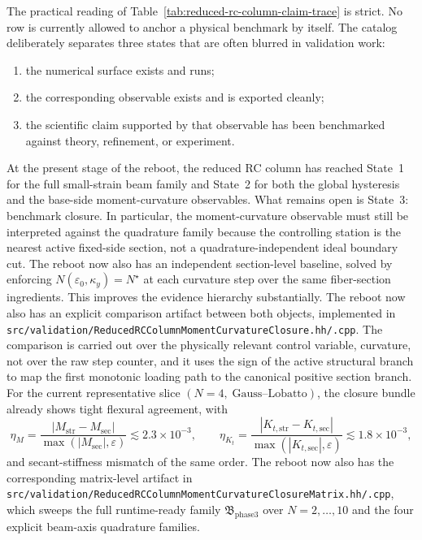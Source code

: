 The practical reading of Table~\ref{tab:reduced-rc-column-claim-trace} is
strict.  No row is currently allowed to anchor a physical benchmark by itself.
The catalog deliberately separates three states that are often blurred in
validation work:
\begin{enumerate}
  \item the numerical surface exists and runs;
  \item the corresponding observable exists and is exported cleanly;
  \item the scientific claim supported by that observable has been benchmarked
    against theory, refinement, or experiment.
\end{enumerate}
At the present stage of the reboot, the reduced RC column has reached
State~1 for the full small-strain beam family and State~2 for both the global
hysteresis and the base-side moment-curvature observables.  What remains open
is State~3: benchmark closure.  In particular, the moment-curvature observable
must still be interpreted against the quadrature family because the controlling
station is the nearest active fixed-side section, not a quadrature-independent
ideal boundary cut.  The reboot now also has an independent section-level
baseline, solved by enforcing
\(
  N(\varepsilon_0,\kappa_y)=N^\star
\)
at each curvature step over the same fiber-section ingredients.  This improves
the evidence hierarchy substantially.  The reboot now also has an explicit
comparison artifact between both objects, implemented in
\texttt{src/validation/ReducedRCColumnMomentCurvatureClosure.hh/.cpp}.  The
comparison is carried out over the physically relevant control variable,
curvature, not over the raw step counter, and it uses the sign of the active
structural branch to map the first monotonic loading path to the canonical
positive section branch.  For the current representative slice
\((N=4,\;\text{Gauss--Lobatto})\), the closure bundle already shows tight
flexural agreement, with
\[
  \eta_M
  =
  \frac{|M_{\mathrm{str}}-M_{\mathrm{sec}}|}
       {\max(|M_{\mathrm{sec}}|,\varepsilon)}
  \lesssim 2.3\times 10^{-3},
  \qquad
  \eta_{K_t}
  =
  \frac{|K_{t,\mathrm{str}}-K_{t,\mathrm{sec}}|}
       {\max(|K_{t,\mathrm{sec}}|,\varepsilon)}
  \lesssim 1.8\times 10^{-3},
\]
and secant-stiffness mismatch of the same order.  The reboot now also has the
corresponding matrix-level artifact in
\texttt{src/validation/ReducedRCColumnMomentCurvatureClosureMatrix.hh/.cpp},
which sweeps the full runtime-ready family
\(
  \mathfrak{B}_{\text{phase3}}
\)
over \(N=2,\dots,10\) and the four explicit beam-axis quadrature families.
